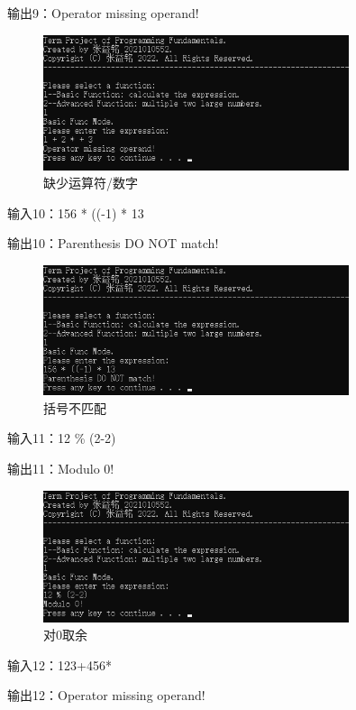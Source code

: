 \documentclass[a4paper, 11pt, UTF8]{ctexart}
\begin{document}
输出9：Operator missing operand!

\begin{figure}[H]
    \centering
    \caption{缺少运算符/数字}
    \includegraphics[width=0.8\textwidth]{t10.png}    
\end{figure}

输入10：156 * ((-1) * 13

输出10：Parenthesis DO NOT match!

\begin{figure}[H]
    \centering
    \caption{括号不匹配}
    \includegraphics[width=0.8\textwidth]{t9.png}
\end{figure}

输入11：12 \% (2-2)

输出11：Modulo 0!

\begin{figure}[H]
    \centering
    \caption{对0取余}
    \includegraphics[width=0.8\textwidth]{t11.png}
\end{figure}

输入12：123+456*

输出12：Operator missing operand!
\end{document}
